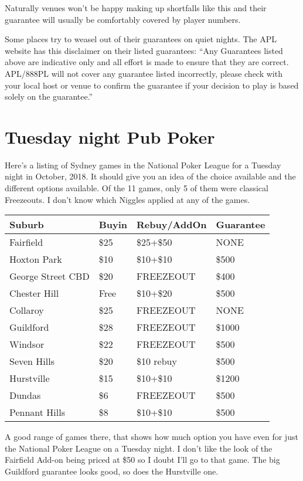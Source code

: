 Naturally venues won't be happy making up shortfalls like this and
their guarantee will usually be comfortably covered by player numbers.

Some places try to weasel out of their guarantees on quiet nights.
The APL website has this disclaimer on their listed guarantees:
``Any Guarantees listed above are indicative only and all effort
is made to ensure that they are correct. APL/888PL will not cover
any guarantee listed incorrectly, please check with your local
host or venue to confirm the guarantee if your decision to
play is based solely on the guarantee.''

\section{Tuesday night Pub Poker}

Here's a listing of Sydney games in the National Poker League
for a Tuesday night in October, 2018. It should give you an
idea of the choice available and the different options available.
Of the 11 games, only 5 of them were classical Freezeouts.
I don't know which Niggles applied at any of the games.


\begin{tabular}{|l|l|l|l|} \hline
Suburb & Buyin & Rebuy/AddOn & Guarantee \\ \hline
Fairfield        & \$25 & \$25+\$50 & NONE \\ \hline
Hoxton Park       & \$10 & \$10+\$10 & \$500 \\ \hline
George Street CBD & \$20 & FREEZEOUT & \$400 \\ \hline
Chester Hill & Free & \$10+\$20 & \$500 \\ \hline
Collaroy & \$25 & FREEZEOUT & NONE \\ \hline
Guildford & \$28 & FREEZEOUT & \$1000 \\ \hline
Windsor & \$22 & FREEZEOUT & \$500 \\ \hline
Seven Hills & \$20 & \$10 rebuy & \$500 \\ \hline
Hurstville & \$15 & \$10+\$10 & \$1200 \\ \hline
Dundas & \$6 & FREEZEOUT & \$500 \\ \hline
Pennant Hills & \$8 & \$10+\$10 & \$500 \\ \hline
\end{tabular}

A good range of games there, that shows how much option you
have even for just the National Poker League on a Tuesday night.
I don't like the look of the Fairfield Add-on being priced at \$50
so I doubt I'll go to that game. The big Guildford guarantee looks
good, so does the Hurstville one. 

